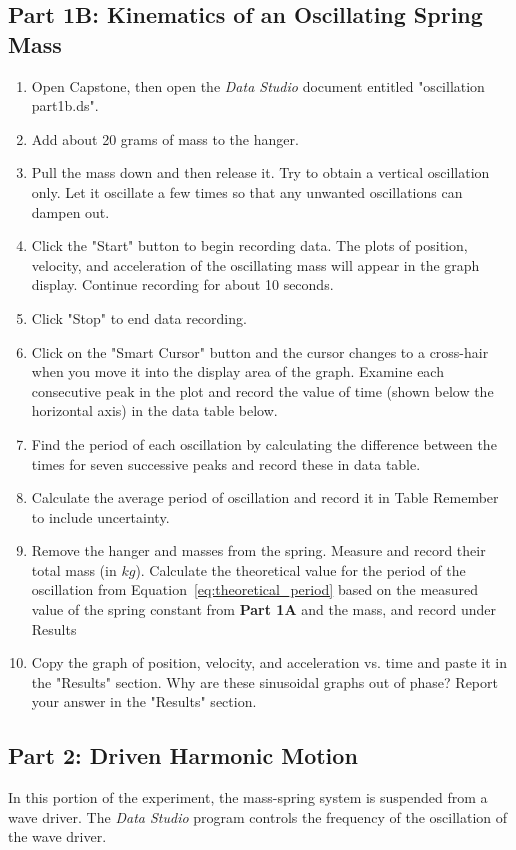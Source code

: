 \documentclass[twocolumn,english]{IEEEtran}
\theoremstyle{plain}
\theoremstyle{plain}
\begin{document}
\subsection*{Part 1B: Kinematics of an Oscillating Spring Mass}
\begin{enumerate}
  \item
   Open Capstone, then open the \textit{Data Studio} document entitled "oscillation part1b.ds".
  \item
   Add about 20 grams of mass to the hanger.
  \item
   Pull the mass down and then release it.
   Try to obtain a vertical oscillation only.
   Let it oscillate a few times so that any unwanted oscillations can dampen out.
  \item
   Click the "Start" button to begin recording data.
   The plots of position, velocity, and acceleration of the oscillating mass will appear in the graph display.
   Continue recording for about 10 seconds.
  \item
   Click "Stop" to end data recording.
  \item
   Click on the "Smart Cursor" button and the cursor changes to a cross-hair when you move it into the display area of the graph.
   Examine each consecutive peak in the plot and record the value of time (shown below the horizontal axis) in the data table below. %
  \item
   Find the period of each oscillation by calculating the difference between the times for seven successive peaks and record these in data table. %
  \item
   Calculate the average period of oscillation and record it in Table %
   Remember to include uncertainty.
  \item
   Remove the hanger and masses from the spring.
   Measure and record their total mass (in $kg$).
   Calculate the theoretical value for the period of the oscillation from Equation~\ref{eq:theoretical_period} based on the measured value of the spring constant from \textbf{Part 1A} and the mass, and record under Results %
  \item
   Copy the graph of position, velocity, and acceleration vs. time and paste it in the "Results" section.
   Why are these sinusoidal graphs out of phase?
   Report your answer in the "Results" section.
\end{enumerate}

\subsection*{Part 2: Driven Harmonic Motion}
 In this portion of the experiment, the mass-spring system is suspended from a wave driver. The \textit{Data Studio} program controls the frequency of the oscillation of the wave driver.
\end{document}
